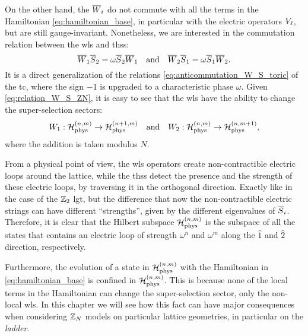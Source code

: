 On the other hand, the $\overline{W}_i$ do not commute with all the terms in the Hamiltonian \eqref{eq:hamiltonian_base}, in particular with the electric operators $V_{\ell}$, but are still gauge-invariant.
Nonetheless, we are interested in the commutation relation between the \ac{wl}s and \ac{ths}s:
\begin{equation}
    \Wilson_1 \tHooft_2 = \omega \tHooft_2 \Wilson_1
    \qand
    \Wilson_2 \tHooft_1 = \omega \tHooft_1 \Wilson_2.
    \label{eq:relation_W_S_ZN}
\end{equation}
It is a direct generalization of the relations \eqref{eq:anticommutation_W_S_toric} of the \ac{tc}, where the sign $-1$ is upgraded to a characteristic phase $\omega$.
Given \eqref{eq:relation_W_S_ZN}, it is easy to see that the \ac{wl}s have the ability to change the super-selection sectors:
\begin{equation}
    W_1 : \Hphys^{(n,m)} \to \Hphys^{(n+1,m)}
    \qand
    W_2 : \Hphys^{(n,m)} \to \Hphys^{(n,m+1)},
    \label{eq:azione_wilson_loop}
\end{equation}
where the addition is taken modulus $N$.

From a physical point of view, the \ac{wl}s operators create non-contractible electric loops around the lattice, while the \ac{ths}s detect the presence and the strength of these electric loops, by traversing it in the orthogonal direction.
Exactly like in the case of the $\mathbb{Z}_2$ \ac{lgt}, but the difference that now the non-contractible electric strings can have different ``strengths'', given by the different eigenvalues of $\overline{S}_i$.
Therefore, it is clear that the Hilbert subspace $\mathcal{H}_{\text{phys}}^{(n, m)}$ is the subspace of all the states that contains an electric loop of strength $\omega^n$ and $\omega^{m}$ along the $\hat{1}$ and $\hat{2}$ direction, respectively.

Furthermore, the evolution of a state in $\mathcal{H}_{\text{phys}}^{(n,m)}$ with the Hamiltonian in \eqref{eq:hamiltonian_base} is confined in $\mathcal{H}_{\text{phys}}^{(n,m)}$.
This is because none of the local terms in the Hamiltonian can change the super-selection sector, only the non-local \ac{wl}s.
In this chapter we will see how this fact can have major consequences when considering $\mathbb{Z}_N$ models on particular lattice geometries, in particular on the \emph{ladder}.
